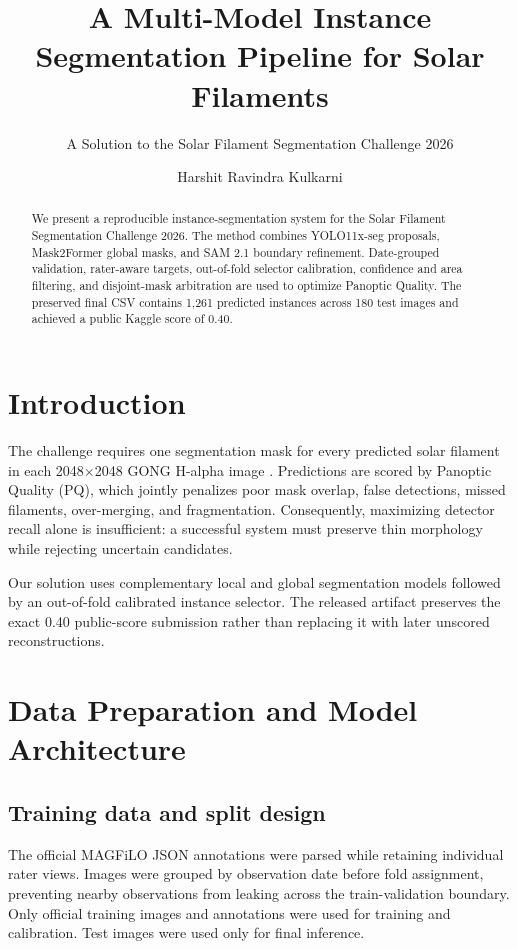 \documentclass[sigconf]{acmart}
\begin{document}
\title{A Multi-Model Instance Segmentation Pipeline for Solar Filaments}
\subtitle{A Solution to the Solar Filament Segmentation Challenge 2026}

\author{Harshit Ravindra Kulkarni}

\begin{abstract}
We present a reproducible instance-segmentation system for the Solar Filament Segmentation Challenge 2026. The method combines YOLO11x-seg proposals, Mask2Former global masks, and SAM 2.1 boundary refinement. Date-grouped validation, rater-aware targets, out-of-fold selector calibration, confidence and area filtering, and disjoint-mask arbitration are used to optimize Panoptic Quality. The preserved final CSV contains 1,261 predicted instances across 180 test images and achieved a public Kaggle score of 0.40.
\end{abstract}

\maketitle

\section{Introduction}
The challenge requires one segmentation mask for every predicted solar filament in each 2048$\times$2048 GONG H-alpha image \cite{competition}. Predictions are scored by Panoptic Quality (PQ), which jointly penalizes poor mask overlap, false detections, missed filaments, over-merging, and fragmentation. Consequently, maximizing detector recall alone is insufficient: a successful system must preserve thin morphology while rejecting uncertain candidates.

Our solution uses complementary local and global segmentation models followed by an out-of-fold calibrated instance selector. The released artifact preserves the exact 0.40 public-score submission rather than replacing it with later unscored reconstructions.

\section{Data Preparation and Model Architecture}
\subsection{Training data and split design}
The official MAGFiLO JSON annotations were parsed while retaining individual rater views. Images were grouped by observation date before fold assignment, preventing nearby observations from leaking across the train-validation boundary. Only official training images and annotations were used for training and calibration. Test images were used only for final inference.
\end{document}
